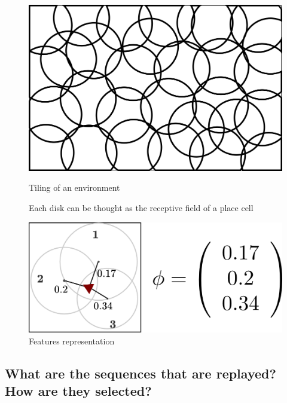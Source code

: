\documentclass[]{article}
\begin{document}
\noindent\begin{figure}[htbp]
  \centering
  \begin{minipage}[t]{.5\linewidth}
    {\centering
    \includegraphics[width=0.9\linewidth]{images/schema_tiling.png}
    \caption{Tiling of an environment}\label{tiling_schema}
    \par}
    \small{Each disk can be thought as the receptive field of a place cell}
  \end{minipage}%
  \begin{minipage}[t]{.5\linewidth}
    \centering
    \includegraphics[width=0.9\linewidth]{images/feature_schema.png}
    \caption{Features representation}\label{feature_schema}
  \end{minipage}
\end{figure}



\subsection{What are the sequences that are replayed? How are they
selected?}\label{what-are-the-sequences-that-are-replayed-how-are-they-selected}
\end{document}
